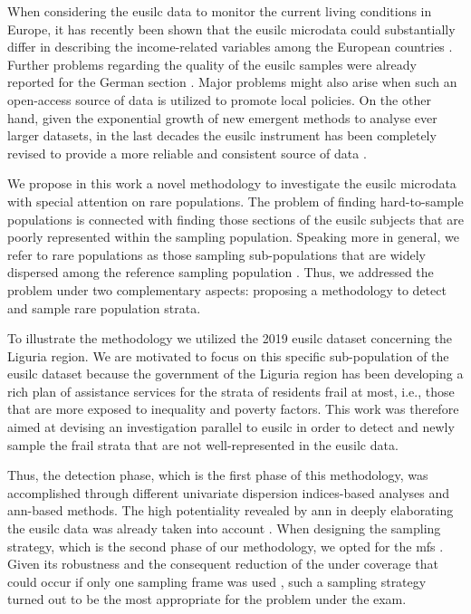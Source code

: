 When considering the \gls{eusilc} data to monitor the current living conditions in Europe, it has recently been shown that the \gls{eusilc} microdata could substantially differ in describing the income-related variables among the European countries \cite[]{trindade2020comparability}.  
Further problems regarding the quality of the \gls{eusilc} samples were already reported for the German section \cite[]{hauser2008problems}.
Major problems might also arise when such an open-access source of data is utilized to promote local policies.
On the other hand, given the exponential growth of new emergent methods to analyse ever larger datasets, in the last decades the \gls{eusilc} instrument has been completely revised to provide a more reliable and consistent source of data \cite[]{wirth2022european}.

We propose in this work a novel methodology to investigate the \gls{eusilc} microdata with special attention on rare populations.
The problem of finding hard-to-sample populations is connected with finding those sections of the \gls{eusilc} subjects that are poorly represented within the sampling population.
Speaking more in general, we refer to rare populations as those sampling sub-populations that are widely dispersed among the reference sampling population \cite[]{lohr2021sampling}.
Thus, we addressed the problem under two complementary aspects: proposing a methodology to detect and sample rare population strata.

To illustrate the methodology we utilized the 2019 \gls{eusilc} dataset concerning the Liguria region.
We are motivated to focus on this specific sub-population of the \gls{eusilc} dataset because the government of the Liguria region has been developing a rich plan of assistance services for the strata of residents frail at most, i.e., those that are more exposed to inequality and poverty factors.
This work was therefore aimed at devising an investigation parallel to \gls{eusilc} in order to detect and newly sample the frail strata that are not well-represented in the \gls{eusilc} data. 

Thus, the detection phase, which is the first phase of this methodology, was accomplished through different univariate dispersion indices-based analyses and \gls{ann}-based methods.
The high potentiality revealed by \gls{ann} in deeply elaborating the \gls{eusilc} data was already taken into account \cite[]{veljkovic2023heating, pisati2010mapping}.
When designing the sampling strategy, which is the second phase of our methodology, we opted for the \gls{mfs} \cite{lohr2006multiple, lohr2007recent, lohr2011alternative}.
Given its robustness and the consequent reduction of the under coverage that could occur if only one sampling frame was used \cite{lohr2006multiple}, such a sampling strategy turned out to be the most appropriate for the problem under the exam.

